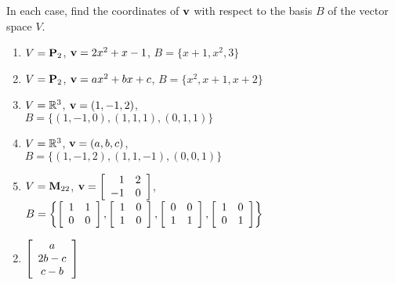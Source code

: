 \begin{multicols}{1}
\begin{ex}
In each case, find the coordinates of $\textbf{v}$ with respect to the basis $B$ of the vector space $V$.

\begin{enumerate}[label={\alph*.}]
\item $V = \textbf{P}_2$, $\textbf{v} = 2x^2 + x - 1$, $B = \{x + 1, x^2, 3\}$

\item $V = \textbf{P}_2$, $\textbf{v} = ax^2 + bx + c$, $B = \{x^2, x + 1, x + 2\}$

\item $V = \mathbb{R}^3$, $\textbf{v} = (1, -1, 2)$, \\ $B = \{(1, -1, 0), (1, 1, 1), (0, 1, 1)\}$

\item $V = \mathbb{R}^3$, $\textbf{v} = (a, b, c)$, \\ $B = \{(1, -1, 2), (1, 1, -1), (0, 0, 1)\}$

\item $V = \textbf{M}_{22}$, $\textbf{v} = \left[ \begin{array}{rr} 1 & 2 \\ -1 & 0 \end{array} \right]$, \\ $B = \left\{ \left[ \begin{array}{rr} 1 & 1 \\ 0 & 0 \end{array} \right], \left[ \begin{array}{rr} 1 & 0 \\ 1 & 0 \end{array} \right], \left[ \begin{array}{rr} 0 & 0 \\ 1 & 1 \end{array} \right], \left[ \begin{array}{rr} 1 & 0 \\ 0 & 1 \end{array} \right] \right\}$


\end{enumerate}
\begin{sol}
\begin{enumerate}[label={\alph*.}]
\setcounter{enumi}{1}
\item $\left[ \begin{array}{c} a \\ 2b - c \\ c - b \end{array} \right]$



\end{enumerate}
\end{sol}
\end{ex}
\end{multicols}
